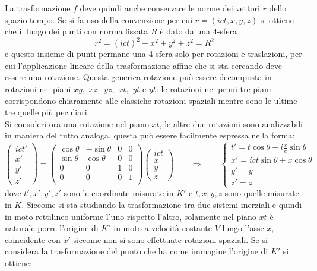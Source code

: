 La trasformazione $f$ deve quindi anche conservare le norme dei vettori $r$ dello spazio tempo. Se si fa uso della convenzione per cui $r=(ict,x,y,z)$ si ottiene che il luogo dei punti con norma fissata $R$ è dato da una 4-sfera
\begin{equation}
    r^2=(ict)^2+x^2+y^2+z^2=R^2
    \label{4-sfera}
\end{equation} 
e questo insieme di punti permane una 4-sfera solo per rotazioni e traslazioni, per cui l'applicazione lineare della trasformazione affine che si sta cercando deve essere una rotazione. Questa generica rotazione può essere decomposta in rotazioni nei piani $xy,$ $xz,$ $yz,$ $xt,$ $yt$ e $yt$: le rotazioni nei primi tre piani corrispondono chiaramente alle classiche rotazioni spaziali mentre sono le ultime tre quelle più peculiari.\\ Si consideri ora una rotazione nel piano $xt$, le altre due rotazioni sono analizzabili in maniera del tutto analoga, questa può essere facilmente espressa nella forma:
\begin{equation*}
   \begin{pmatrix}
    ict'\\x'\\y'\\z'
   \end{pmatrix}
   =\begin{pmatrix}
    \cos\theta & -\sin\theta & 0 & 0\\
    \sin\theta & \cos\theta & 0 & 0\\
    0& 0 & 1 & 0\\
    0& 0 & 0 & 1\\
   \end{pmatrix}
   \begin{pmatrix}
    ict\\x\\y\\z
   \end{pmatrix}\qquad
   \Rightarrow \qquad
   \begin{cases}
    t'=t\cos\theta+i\frac{x}{c}\sin\theta\\
    x'=ict\sin\theta+x\cos\theta\\
    y'=y\\
    z'=z
   \end{cases}
\end{equation*}
dove $t',x',y',z'$ sono le coordinate misurate in $K'$ e $t,x,y,z$ sono quelle misurate in $K$. Siccome si sta studiando la trasformazione tra due sistemi inerziali e quindi in moto rettilineo uniforme l'uno rispetto l'altro, solamente nel piano $xt$ è naturale porre l'origine di $K'$ in moto a velocità costante $V$ lungo l'asse $x$, coincidente con $x'$ siccome non si sono effettuate rotazioni spaziali. Se si considera la trasformazione del punto che ha come immagine l'origine di $K'$ si ottiene:
